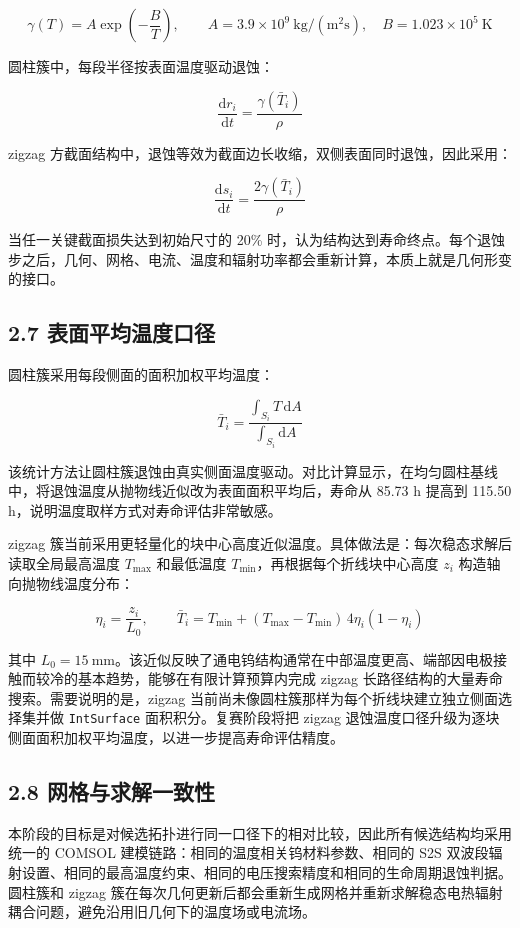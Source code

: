 \documentclass[
  a4paper,
]{ctexart}
\begin{document}
\[
\gamma(T)=A\exp\left(-\frac{B}{T}\right),\qquad
A=3.9\times10^9\ \mathrm{kg/(m^2s)},\quad B=1.023\times10^5\ \mathrm K
\]

圆柱簇中，每段半径按表面温度驱动退蚀：

\[
\frac{\mathrm dr_i}{\mathrm dt}=\frac{\gamma(\bar T_i)}{\rho}
\]

zigzag
方截面结构中，退蚀等效为截面边长收缩，双侧表面同时退蚀，因此采用：

\[
\frac{\mathrm ds_i}{\mathrm dt}=\frac{2\gamma(\bar T_i)}{\rho}
\]

当任一关键截面损失达到初始尺寸的 20\%
时，认为结构达到寿命终点。每个退蚀步之后，几何、网格、电流、温度和辐射功率都会重新计算，本质上就是几何形变的接口。

\subsection{2.7
表面平均温度口径}\label{ux8868ux9762ux5e73ux5747ux6e29ux5ea6ux53e3ux5f84}

圆柱簇采用每段侧面的面积加权平均温度：

\[
\bar T_i=\frac{\int_{S_i}T\,\mathrm dA}{\int_{S_i}\mathrm dA}
\]

该统计方法让圆柱簇退蚀由真实侧面温度驱动。对比计算显示，在均匀圆柱基线中，将退蚀温度从抛物线近似改为表面面积平均后，寿命从
85.73 h 提高到 115.50 h，说明温度取样方式对寿命评估非常敏感。

zigzag
簇当前采用更轻量化的块中心高度近似温度。具体做法是：每次稳态求解后读取全局最高温度
\(T_\mathrm{max}\) 和最低温度
\(T_\mathrm{min}\)，再根据每个折线块中心高度 \(z_i\)
构造轴向抛物线温度分布：

\[
\eta_i=\frac{z_i}{L_0},\qquad
\bar T_i=T_\mathrm{min}+
(T_\mathrm{max}-T_\mathrm{min})\,4\eta_i(1-\eta_i)
\]

其中
\(L_0=15\ \mathrm{mm}\)。该近似反映了通电钨结构通常在中部温度更高、端部因电极接触而较冷的基本趋势，能够在有限计算预算内完成
zigzag 长路径结构的大量寿命搜索。需要说明的是，zigzag
当前尚未像圆柱簇那样为每个折线块建立独立侧面选择集并做
\texttt{IntSurface} 面积积分。复赛阶段将把 zigzag
退蚀温度口径升级为逐块侧面面积加权平均温度，以进一步提高寿命评估精度。

\subsection{2.8
网格与求解一致性}\label{ux7f51ux683cux4e0eux6c42ux89e3ux4e00ux81f4ux6027}

本阶段的目标是对候选拓扑进行同一口径下的相对比较，因此所有候选结构均采用统一的 COMSOL 建模链路：相同的温度相关钨材料参数、相同的 S2S 双波段辐射设置、相同的最高温度约束、相同的电压搜索精度和相同的生命周期退蚀判据。圆柱簇和 zigzag 簇在每次几何更新后都会重新生成网格并重新求解稳态电热辐射耦合问题，避免沿用旧几何下的温度场或电流场。
\end{document}
